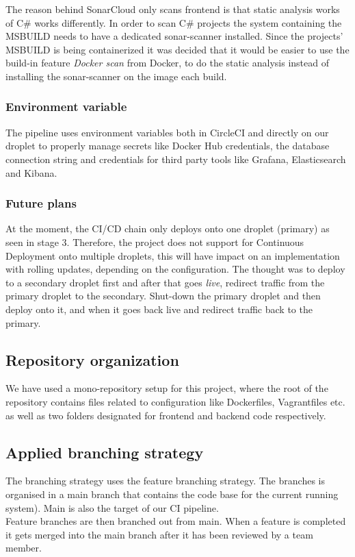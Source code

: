 The reason behind SonarCloud only scans frontend is that static analysis works of C\# works differently. In order to scan C\# projects the system containing the MSBUILD needs to have a dedicated sonar-scanner installed. Since the projects' MSBUILD is being containerized it was decided that it would be easier to use the build-in feature \textit{Docker scan} from Docker, to do the static analysis instead of installing the sonar-scanner on the image each build.

\subsubsection{Environment variable}
The pipeline uses environment variables both in CircleCI and directly on our droplet to properly manage secrets like Docker Hub credentials, the database connection string and credentials for third party tools like Grafana, Elasticsearch and Kibana.

\subsubsection{Future plans}
At the moment, the CI/CD chain only deploys onto one droplet (primary) as seen in stage 3. Therefore, the project does not support for Continuous Deployment onto multiple droplets, this will have impact on an implementation with rolling updates, depending on the configuration. The thought was to deploy to a secondary droplet first and after that goes \textit{live}, redirect traffic from the primary droplet to the secondary. Shut-down the primary droplet and then deploy onto it, and when it goes back live and redirect traffic back to the primary.

\subsection{Repository organization}
We have used a mono-repository setup for this project, where the root of the repository contains files related to configuration like Dockerfiles, Vagrantfiles etc. as well as two folders designated for frontend and backend code respectively.


\subsection{Applied branching strategy}
The branching strategy uses the feature branching strategy. The branches is organised in a main branch that contains the code base for the current running system). Main is also the target of our CI pipeline. \\
Feature branches are then branched out from main. When a feature is completed it gets merged into the main branch after it has been reviewed by a team member.

